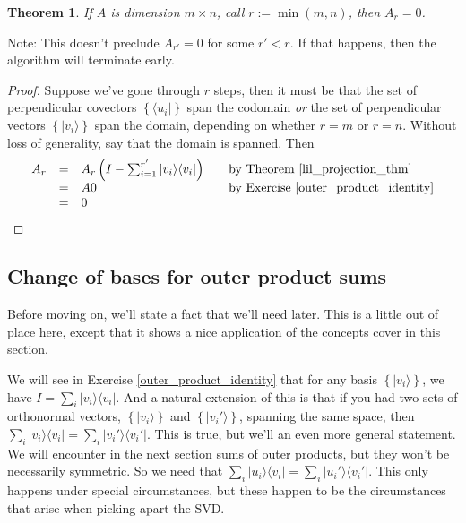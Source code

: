 \documentclass{amsbook}
\newtheorem{theorem}{Theorem}
\begin{document}
 \begin{theorem}
\label{svd_terminates}
If $A$ is dimension $m\times n$, call $r:=\min(m,n)$, then $A_r=0$.
 \end{theorem}

Note:  This doesn't preclude $A_{r'}=0$ for some $r'<r$.  If that happens, then the algorithm will terminate early.

\begin{proof}
Suppose we've gone through $r$ steps, then it must be that the set of perpendicular covectors $\left\{\langle u _i|\right\}$ span the codomain {\em or} the set of perpendicular vectors $\left\{| v _i\rangle\right\}$ span the domain, depending on whether $r=m$ or $r=n$.  Without loss of generality, say that the domain is spanned.  Then 
$$
\begin{array}{rcll}
A_r&=&A_r\left(I-\sum_{i=1}^{r'}| v _i\rangle\langle v _i|\right)&\quad\text{by Theorem \ref{lil_projection_thm}}\\
&=&A0&\quad\text{by Exercise \ref{outer_product_identity}}\\
&=&0&
\end{array}
$$
\end{proof}

\subsection{Change of bases for outer product sums}

Before moving on, we'll state a fact that we'll need later.  This is a little out of place here, except that it shows a nice application of the concepts cover in this section.

We will see in Exercise \ref{outer_product_identity} that for any basis $\left\{|v_i\rangle\right\}$, we have $I=\sum_i|v_i\rangle\langle v_i|$.  And a natural extension of this is that if you had two sets of orthonormal vectors, $\left\{|v_i\rangle\right\}$ and $\left\{|v_i'\rangle\right\}$, spanning the same space, then $\sum_i|v_i\rangle\langle v_i|=\sum_i|v_i'\rangle\langle v_i'|$.  This is true, but we'll an even more general statement.  We will encounter in the next section sums of outer products, but they won't be necessarily symmetric.  So we need that $\sum_i|u_i\rangle\langle v_i|=\sum_i|u_i'\rangle\langle v_i'|$.  This only happens under special circumstances, but these happen to be the circumstances that arise when picking apart the SVD.
\end{document}
